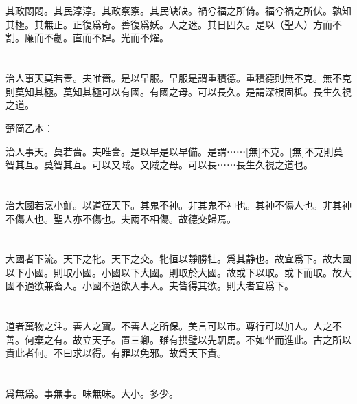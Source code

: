 \documentclass[a5paper]{ctexbook}
\begin{document}
    \chapter{}

    其政悶悶。其民淳淳。其政察察。其民缺缺。禍兮福之所倚。福兮禍之所伏。孰知其極。其無正。正復爲奇。善復爲妖。人之迷。其日固久。是以（聖人）方而不割。廉而不劌。直而不肆。光而不燿。

    \chapter{}

    治人事天莫若嗇。夫唯嗇。是以早服。早服是謂重積德。重積德則無不克。無不克則莫知其極。莫知其極可以有國。有國之母。可以長久。是謂深根固柢。長生久視之道。

    楚简乙本：

    治人事天。莫若嗇。夫唯嗇。是以早是以早備。是謂⋯⋯[無]不克。[無]不克則莫智其互。莫智其互。可以又䧕。又䧕之母。可以長⋯⋯長生久視之道也。

    \chapter{}

    治大國若烹小鮮。以道莅天下。其鬼不神。非其鬼不神也。其神不傷人也。非其神不傷人也。聖人亦不傷也。夫兩不相傷。故德交歸焉。

    \chapter{}

    大國者下流。天下之牝。天下之交。牝恒以靜勝牡。爲其静也。故宜爲下。故大國以下小國。則取小國。小國以下大國。則取於大國。故或下以取。或下而取。故大國不過欲兼畜人。小國不過欲入事人。夫皆得其欲。則大者宜爲下。

    \chapter{}

    道者萬物之注。善人之寶。不善人之所保。美言可以市。尊行可以加人。人之不善。何棄之有。故立天子。置三卿。雖有拱璧以先駟馬。不如坐而進此。古之所以貴此者何。不曰求以得。有罪以免邪。故爲天下貴。

    \chapter{}

    爲無爲。事無事。味無味。大小。多少。
    
\end{document}
